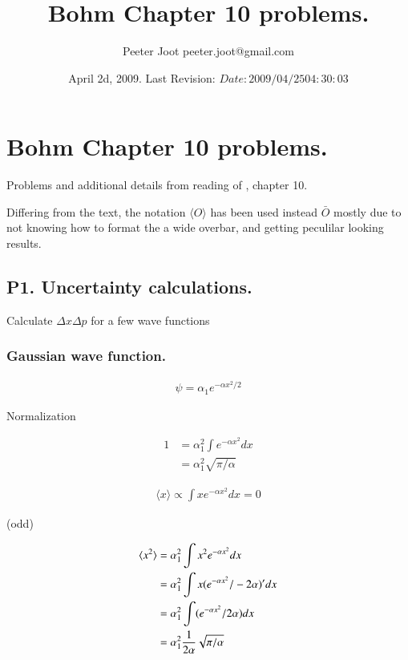 \documentclass{article}
\title{ Bohm Chapter 10 problems. }
\author{Peeter Joot \quad peeter.joot@gmail.com }
\date{ April 2d, 2009.  Last Revision: $Date: 2009/04/25 04:30:03 $ }
\newcommand{\expectation}[1]{\langle{#1}\rangle}
\begin{document}
\maketitle{}
\tableofcontents
\section{ Bohm Chapter 10 problems. }

Problems and additional details from reading of \cite{bohm1989qt}, chapter 10.

Differing from the text, the notation $\expectation{O}$ has been used instead $\bar{O}$ mostly due to not knowing how to format the a wide overbar, and getting peculilar looking results.

\subsection{ P1. Uncertainty calculations. }

Calculate $\Delta x \Delta p$ for a few wave functions

\subsubsection{ Gaussian wave function. }

\begin{align*}
\psi = \alpha_1 e^{-\alpha x^2/2}
\end{align*}

Normalization

\begin{align*}
1 
&= \alpha_1^2 \int e^{-\alpha x^2} dx \\
&= \alpha_1^2 \sqrt{\pi/\alpha}
\end{align*}

\begin{align*}
\expectation{x} \propto \int x e^{-\alpha x^2} dx = 0
\end{align*}

(odd)

\begin{align*}
\expectation{x^2} 
&= \alpha_1^2 \int x^2 e^{-\alpha x^2} dx \\
&= \alpha_1^2 \int x (e^{-\alpha x^2}/-2\alpha)' dx \\
&= \alpha_1^2 \int (e^{-\alpha x^2}/2\alpha) dx \\
&= \alpha_1^2 \inv{2\alpha} \sqrt{\pi/\alpha}
\end{align*}
\end{document}
